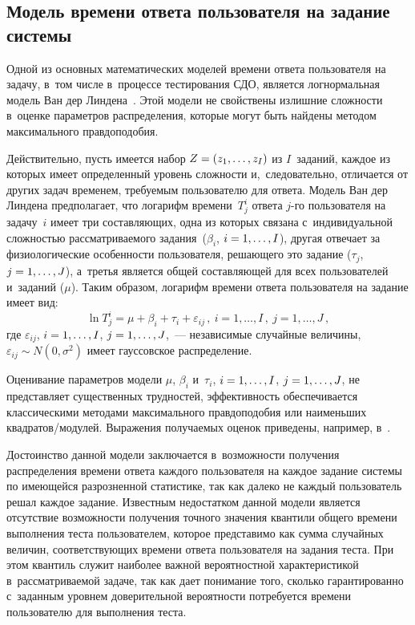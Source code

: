 \begin{multicols}{2}
\vspace*{-6pt}
    
\section{Модель времени ответа пользователя на задание системы }

    Одной из основных математических моделей времени ответа пользователя 
на задачу, в~том числе в~процессе тестирования СДО, является логнормальная 
модель Ван дер Линдена~\cite{2-b}. Этой модели не свойствены излишние 
сложности в~оценке параметров распределения, которые могут быть найде\-ны 
методом максимального правдоподобия. 
    
    Действительно, пусть имеется набор $Z\hm= (z_1, \ldots , z_I)$ из 
$I$~заданий, каждое из которых имеет определенный уровень сложности 
и,~следовательно, отличается от других задач временем, требуемым пользователю 
для ответа. Модель Ван дер Линдена предполагает, что логарифм 
времени~$T_j^i$ ответа $j$-го пользователя на задачу~$i$ имеет три 
составляющих, одна из которых связана с~индивидуальной сложностью 
рассматриваемого задания~($\beta_i$, $i\hm=1, \ldots , I$), другая отвечает за 
физиологические особенности пользователя, решающего это задание ($\tau_j$, 
$j\hm= 1,\ldots , J$), а~третья является общей составляющей для всех 
пользователей и~заданий ($\mu$). Таким образом, логарифм времени ответа 
пользователя на задание имеет вид:
    $$
    \ln T_j^i =\mu+\beta_i+\tau_i+\varepsilon_{ij}\,,\ i=1,\ldots , I\,,\ j=1,\ldots , 
J\,,
    $$
где $\varepsilon_{ij}$, $i\hm= 1,\ldots , I$, $j\hm= 1,\ldots , J$,~--- независимые 
случайные величины,  
$\varepsilon_{ij}\sim N(0,\sigma^2)$ имеет гауссовское распределение.
    
    Оценивание параметров модели $\mu$, $\beta_i$ и~$\tau_i$, $i\hm=1, \ldots , I$, 
    $j\hm= 1,\ldots , J$, не представляет существенных трудностей, 
эффективность обеспечивается классическими методами максимального 
правдоподобия или наименьших квадратов/модулей. Выражения получаемых 
оценок приведены, например, в~\cite{2-b}. 
    
    Достоинство данной модели заключается в~возможности получения 
распределения времени ответа каждого пользователя на каждое задание 
системы по имеющейся разрозненной статистике, так как далеко не каждый 
пользователь решал каждое задание. Известным недостатком данной модели 
является отсутствие возможности получения точного значения квантили 
общего времени выполнения теста пользователем, которое представимо как 
сумма случайных величин, соответствующих времени ответа пользователя на 
задания теста. При этом квантиль служит наиболее важной вероятностной 
характеристикой в~рассматриваемой задаче, так как дает понимание того, 
сколько гарантированно с~заданным уровнем доверительной вероятности 
потребуется времени пользователю для выполнения теста.
    

\end{multicols}
